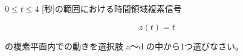 $0 \leq t \leq 4$ [秒]の範囲における時間領域複素信号 

\[
z(t) = t
\]

\medskip
\noindent の複素平面内での動きを選択肢 a〜d の中から1つ選びなさい。

